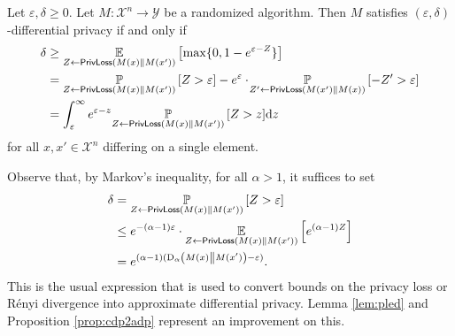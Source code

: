 \documentclass{jpc}
\newcommand{\ex}[2]{{\ifx&#1& \mathbb{E} \else
\underset{#1}{\mathbb{E}} \fi \left[#2\right]}}
\newcommand{\pr}[2]{{\ifx&#1& \mathbb{P} \else
\underset{#1}{\mathbb{P}} \fi \left[#2\right]}}
\newcommand{\dr}[3]{\mathrm{D}_{#1}\left(#2\middle\|#3\right)}
\newcommand{\eps}{\varepsilon}
\newcommand{\privloss}[2]{\mathsf{PrivLoss}\left(#1\middle\|#2\right)}
\newcommand{\dx}[1][x]{\mathrm{d}#1}
\begin{document}
\begin{lem}\label{lem:pled}Let $\eps,\delta\ge 0$. Let $M\colon \mathcal{X}^n \to \mathcal{Y}$ be a randomized algorithm. Then $M$ satisfies $(\eps,\delta)$-differential privacy if and only if
\begin{align}
    \delta 
    &\ge \ex{Z \gets \privloss{M(x)}{M(x')}}{\max\{0,1-e^{\eps-Z}\}} \label{eq:pled1}\\
    &= \pr{Z \gets \privloss{M(x)}{M(x')}}{Z>\eps} - e^\eps \cdot \! \pr{Z' \gets \privloss{M(x')}{M(x)}}{-Z'>\eps}\label{eq:pled2}\\
    &= \int_\eps^\infty e^{\eps-z} \pr{Z \gets \privloss{M(x)}{M(x')}}{Z>z} \dx[z] \label{eq:pled3}
\end{align}
for all $x,x' \in \mathcal{X}^n$ differing on a single element.
\end{lem}
\noindent Observe that, by Markov's inequality, for all $\alpha > 1$, it suffices to set
\begin{align}
    \delta &= \pr{Z \gets \privloss{M(x)}{M(x')}}{Z>\eps} \notag\\
    &\le e^{-(\alpha-1)\eps} \cdot \ex{Z \gets \privloss{M(x)}{M(x')}}{e^{(\alpha-1)Z}} \notag\\
    &= e^{(\alpha-1)(\dr{\alpha}{M(x)}{M(x')} - \eps)}.
\end{align} This is the usual expression that is used to convert bounds on the privacy loss or R\'enyi divergence into approximate differential privacy. Lemma \ref{lem:pled} and Proposition \ref{prop:cdp2adp} represent an improvement on this.
\end{document}
